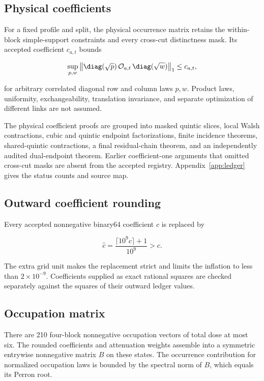 \subsection{Physical coefficients}

For a fixed profile and split, the physical occurrence matrix retains the within-block simple-support constraints and every cross-cut distinctness mask. Its accepted coefficient $c_{a,t}$ bounds

\begin{equation}
\sup_{p,w}
\left\|
\diag(\sqrt p)\,\mathcal O_{a,t}\,\diag(\sqrt w)
\right\|_1
\le c_{a,t},
\label{eq:onebatch-coefficient}
\end{equation}

for arbitrary correlated diagonal row and column laws $p,w$. Product laws, uniformity, exchangeability, translation invariance, and separate optimization of different links are not assumed.

The physical coefficient proofs are grouped into masked quintic slices, local Walsh contractions, cubic and quintic endpoint factorizations, finite incidence theorems, shared-quintic contractions, a final residual-chain theorem, and an independently audited dual-endpoint theorem. Earlier coefficient-one arguments that omitted cross-cut masks are absent from the accepted registry. Appendix~\ref{app:ledger} gives the status counts and source map.

\subsection{Outward coefficient rounding}

Every accepted nonnegative binary64 coefficient $c$ is replaced by

\begin{equation}
\widehat c
=\frac{\lceil10^9c\rceil+1}{10^9}>c.
\label{eq:onebatch-grid}
\end{equation}

The extra grid unit makes the replacement strict and limits the inflation to less than $2\times10^{-9}$. Coefficients supplied as exact rational squares are checked separately against the squares of their outward ledger values.

\subsection{Occupation matrix}

There are 210 four-block nonnegative occupation vectors of total dose at most six. The rounded coefficients and attenuation weights assemble into a symmetric entrywise nonnegative matrix $B$ on these states. The occurrence contribution for normalized occupation laws is bounded by the spectral norm of $B$, which equals its Perron root.

